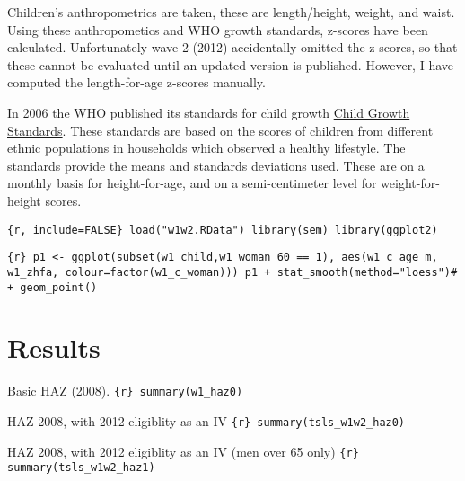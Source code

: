 \documentclass[draft.tex]{subfiles}
\begin{document}
Children's anthropometrics are taken, these are length/height, weight,
and waist. Using these anthropometics and WHO growth standards, z-scores
have been calculated. Unfortunately wave 2 (2012) accidentally omitted
the z-scores, so that these cannot be evaluated until an updated version
is published. However, I have computed the length-for-age z-scores
manually.

In 2006 the WHO published its standards for child growth
\href{http://www.who.int/childgrowth/en/}{Child Growth Standards}. These
standards are based on the scores of children from different ethnic
populations in households which observed a healthy lifestyle. The
standards provide the means and standards deviations used. These are on
a monthly basis for height-for-age, and on a semi-centimeter level for
weight-for-height scores.

\texttt{\{r, include=FALSE\} load("w1w2.RData") library(sem) library(ggplot2)}

\texttt{\{r\} p1 \textless{}- ggplot(subset(w1\_child,w1\_woman\_60 == 1), aes(w1\_c\_age\_m, w1\_zhfa, colour=factor(w1\_c\_woman))) p1 + stat\_smooth(method="loess")\# + geom\_point()}

\section{Results}

Basic HAZ (2008). \texttt{\{r\} summary(w1\_haz0)}

HAZ 2008, with 2012 eligiblity as an IV
\texttt{\{r\} summary(tsls\_w1w2\_haz0)}

HAZ 2008, with 2012 eligiblity as an IV (men over 65 only)
\texttt{\{r\} summary(tsls\_w1w2\_haz1)}
\end{document}
